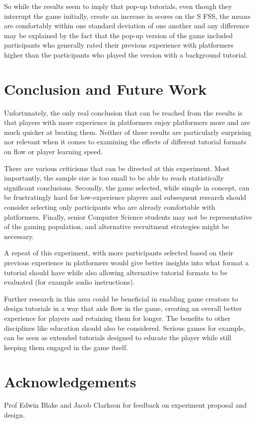 \documentclass{acmsiggraph}
\begin{document}
So while the results seem to imply that pop-up tutorials, even though they interrupt the game initially, create an increase in scores on the S FSS, the means are comfortably within one standard deviation of one another and any difference may be explained by the fact that the pop-up version of the game included participants who generally rated their previous experience with platformers higher than the participants who played the version with a background tutorial. 

\section{Conclusion and Future Work}
Unfortunately, the only real conclusion that can be reached from the results is that players with more experience in platformers enjoy platformers more and are much quicker at beating them. Neither of these results are particularly surprising nor relevant when it comes to examining the effects of different tutorial formats on flow or player learning speed.

There are various criticisms that can be directed at this experiment. Most importantly, the sample size is too small to be able to reach statistically significant conclusions. Secondly, the game selected, while simple in concept, can be frustratingly hard for low-experience players and subsequent research should consider selecting only participants who are already comfortable with platformers. Finally, senior Computer Science students may not be representative of the gaming population, and alternative recruitment strategies might be necessary.

A repeat of this experiment, with more participants selected based on their previous experience in platformers would give better insights into what format a tutorial should have while also allowing alternative tutorial formats to be evaluated (for example audio instructions).

Further research in this area could be beneficial in enabling game creators to design tutorials in a way that aids flow in the game, creating an overall better experience for players and retaining them for longer. The benefits to other disciplines like education should also be considered. Serious games for example, can be seen as extended tutorials designed to educate the player while still keeping them engaged in the game itself.

\section*{Acknowledgements}

Prof Edwin Blake and Jacob Clarkson for feedback on experiment proposal and design.


\nocite{*}

\end{document}
